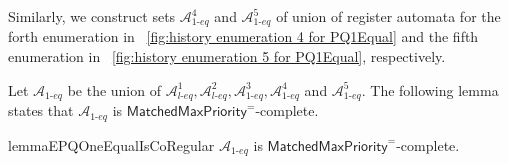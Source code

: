 Similarly, we construct sets $\mathcal{A}_{\textit{1-eq}}^{4}$ and $\mathcal{A}_{\textit{1-eq}}^{5}$ of union of register automata for the forth enumeration in \figurename~\ref{fig:history enumeration 4 for PQ1Equal} and the fifth enumeration in \figurename~\ref{fig:history enumeration 5 for PQ1Equal}, respectively.

Let $\mathcal{A}_{\textit{1-eq}}$ be the union of $\mathcal{A}_{\textit{l-eq}}^1, \mathcal{A}_{\textit{l-eq}}^2,\mathcal{A}_{\textit{1-eq}}^{3}, \mathcal{A}_{\textit{1-eq}}^{4}$ and $\mathcal{A}_{\textit{1-eq}}^{5}$. The following lemma states that $\mathcal{A}_{\textit{1-eq}}$ is $\mathsf{MatchedMaxPriority}^{=}$-complete.


\begin{restatable}{lemma}{EPQOneEqualIsCoRegular}
\label{lemma:EPQ1Equal is co-regular}
$\mathcal{A}_{\textit{1-eq}}$ is $\mathsf{MatchedMaxPriority}^{=}$-complete.
\end{restatable}

